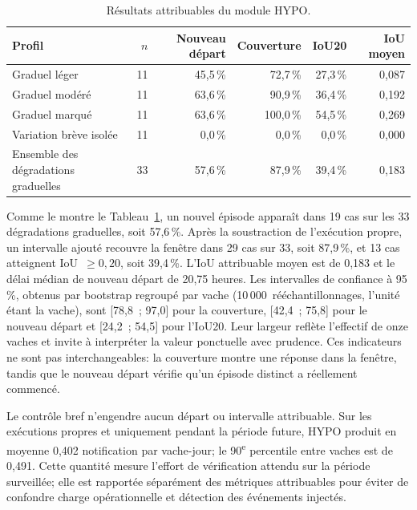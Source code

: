 \begin{table}[H]
  \centering
  \caption{Résultats attribuables du module HYPO.}
  \label{tab:hypo_profiles}
  \small
  \begin{tabular}{lrrrrr}
    \toprule
    Profil & $n$ & Nouveau départ & Couverture & IoU20 & IoU moyen \\
    \midrule
    Graduel léger & 11 & 45,5\,\% & 72,7\,\% & 27,3\,\% & 0,087 \\
    Graduel modéré & 11 & 63,6\,\% & 90,9\,\% & 36,4\,\% & 0,192 \\
    Graduel marqué & 11 & 63,6\,\% & 100,0\,\% & 54,5\,\% & 0,269 \\
    Variation brève isolée & 11 & 0,0\,\% & 0,0\,\% & 0,0\,\% & 0,000 \\
    \midrule
    Ensemble des dégradations graduelles & 33 & 57,6\,\% & 87,9\,\% & 39,4\,\% & 0,183 \\
    \bottomrule
  \end{tabular}
\end{table}

Comme le montre le Tableau~\ref{tab:hypo_profiles}, un nouvel épisode apparaît dans 19 cas
sur les 33 dégradations graduelles, soit 57,6\,\%.
Après la soustraction de l'exécution propre, un intervalle ajouté recouvre la fenêtre dans
29 cas sur 33, soit 87,9\,\%, et 13 cas atteignent IoU~$\geq0{,}20$, soit 39,4\,\%.
L'IoU attribuable moyen est de 0,183 et le délai médian de nouveau départ de 20,75 heures.
Les intervalles de confiance à 95\,\%, obtenus par bootstrap regroupé par vache
\citep{efron1993introduction,fieldwelsh2007bootstrapping}
(10\,000~rééchantillonnages, l'unité étant la vache), sont [78,8~; 97,0] pour la couverture,
[42,4~; 75,8] pour le nouveau départ et [24,2~; 54,5] pour l'IoU20. Leur largeur reflète
l'effectif de onze vaches et invite à interpréter la valeur ponctuelle avec prudence.
Ces indicateurs ne sont pas interchangeables: la couverture montre une réponse dans la
fenêtre, tandis que le nouveau départ vérifie qu'un épisode distinct a réellement commencé.

Le contrôle bref n'engendre aucun départ ou intervalle attribuable. Sur les exécutions
propres et uniquement pendant la période future, HYPO produit en moyenne 0,402
notification par vache-jour; le 90\textsuperscript{e} percentile entre vaches est de 0,491.
Cette quantité mesure l'effort de vérification attendu sur la période surveillée; elle est
rapportée séparément des métriques attribuables pour éviter de confondre charge opérationnelle
et détection des événements injectés.

